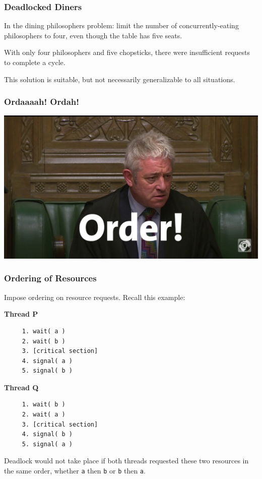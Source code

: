 \begin{frame}
	\frametitle{Deadlocked Diners}

	In the dining philosophers problem: limit the number of concurrently-eating philosophers to four, even though the table has five seats.

	With only four philosophers and five chopsticks, there were insufficient requests to complete a cycle.

	This solution is suitable, but not necessarily generalizable to all situations.

\end{frame}


\begin{frame}
	\frametitle{Ordaaaah! Ordah!}
	\begin{center}
		\includegraphics[width=\textwidth]{images/order.jpg}
	\end{center}
\end{frame}


\begin{frame}[fragile]
	\frametitle{Ordering of Resources}

	Impose ordering on resource requests. Recall this example:

	\begin{multicols}{2}
		\textbf{Thread P}
		\begin{verbatim}
	 1. wait( a ) 
	 2. wait( b )
	 3. [critical section]
	 4. signal( a )
	 5. signal( b )
  \end{verbatim}
		\columnbreak
		\textbf{Thread Q}
		\begin{verbatim}
	 1. wait( b ) 
	 2. wait( a )
	 3. [critical section]
	 4. signal( b )
	 5. signal( a )
  \end{verbatim}
	\end{multicols}
	\vspace{-2em}

	Deadlock would not take place if both threads requested these two resources in the same order, whether \texttt{a} then \texttt{b} or \texttt{b} then \texttt{a}.

\end{frame}

